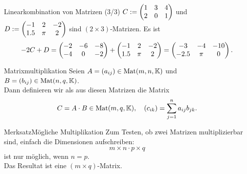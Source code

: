\begin{Beispiel}
{Linearkombination von Matrizen (3/3)}
$C:=\begin{pmatrix}1&3&4\\2&0&1\end{pmatrix}$ und $D:=\begin{pmatrix}-1&2&-2\\1.5&\pi &2\end{pmatrix}$ sind $(2\times 3)$-Matrizen. Es ist\\
\begin{equation*}
    -2C+D=\begin{pmatrix}-2&-6&-8\\-4&0&-2\end{pmatrix}+\begin{pmatrix}-1&2&-2\\1.5&\pi &2\end{pmatrix}=\begin{pmatrix}-3&-4&-10\\-2.5&\pi&0\end{pmatrix}.
\end{equation*}
\end{Beispiel}
\begin{Def}
{Matrixmultiplikation}
Seien $A=(a_{ij})\in\text{Mat}(m,n,\mathbb{K})$ und $B=(b_{ij})\in\text{Mat}(n,q,\mathbb{K})$.\\
Dann definieren wir als  aus diesen Matrizen die Matrix
\begin{equation*}
    C=A\cdot B\in\text{Mat}(m,q,\mathbb{K}),\quad (c_{ik})=\sum_{j=1}^na_{ij}b_{jk}.
\end{equation*}
\end{Def}
\begin{Satz}
{Merksatz}{Mögliche Multiplikation}
Zum Testen, ob zwei Matrizen multiplizierbar sind, einfach die Dimensionen aufschreiben:
\begin{equation*}
    \boxed{m\times n\cdot p\times q}
\end{equation*}
ist nur möglich, wenn $n=p$.\\
Das Resultat ist eine $(m\times q)$-Matrix.
\end{Satz}

